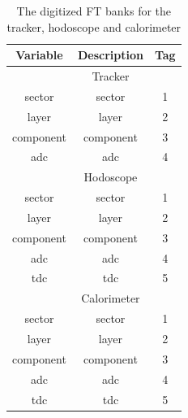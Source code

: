 \begin{table}[h]
	\begin{center}
		\begin{tabular}{| c | c | c |}
			\hline \hline
			Variable         & Description  & Tag  \\
			\hline
		         & Tracker  &   \\
			\hline
                       sector  &                                     sector   &    1   \\
                        layer  &                                      layer   &    2   \\
                    component  &                                  component   &    3   \\
                          adc  &                                         adc  &    4   \\
			\hline
		         & Hodoscope  &   \\
			\hline
                  sector  &                                     sector   &    1   \\
                        layer  &                                      layer   &    2   \\
                    component  &                                  component   &    3   \\
                          adc  &                                         adc  &    4   \\
                          tdc  &                                         tdc  &    5   \\
			\hline
 		         & Calorimeter  &   \\
			\hline
				        sector  &                                     sector   &    1   \\
				   	      layer  &                                      layer   &    2   \\
				        component  &                                  component   &    3   \\
						        adc  &                                         adc  &    4   \\
						        tdc  &                                         tdc  &    5   \\
			\hline \hline
		\end{tabular}
	\end{center}
	\caption{The digitized FT banks for the tracker, hodoscope and calorimeter}\label{tab:ftBank}
\end{table}

